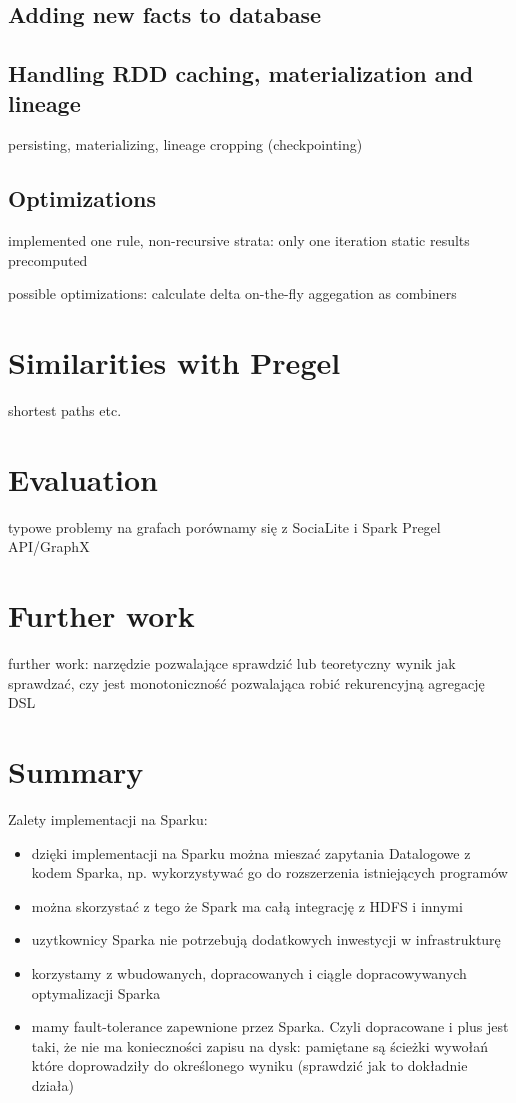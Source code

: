 \subsection{Adding new facts to database}\label{ss:impl_merge}

\subsection{Handling RDD caching, materialization and lineage}
persisting, materializing, lineage cropping (checkpointing)

\subsection{Optimizations}
implemented
	one rule, non-recursive strata: only one iteration
	static results precomputed

possible optimizations:
	calculate delta on-the-fly
	aggegation as combiners


\section{Similarities with Pregel}

shortest paths etc.



\section{Evaluation}\label{s:impl_eval}
typowe problemy na grafach
porównamy się z SociaLite i Spark Pregel API/GraphX


\section{Further work}

further work: narzędzie pozwalające sprawdzić lub teoretyczny wynik jak sprawdzać, czy jest monotoniczność pozwalająca robić rekurencyjną agregację
DSL

\section{Summary}

Zalety implementacji na Sparku:
\begin{itemize}
\item dzięki implementacji na Sparku można mieszać zapytania Datalogowe z kodem Sparka, np. wykorzystywać go do rozszerzenia istniejących programów
\item można skorzystać z tego że Spark ma całą integrację z HDFS i innymi
\item uzytkownicy Sparka nie potrzebują dodatkowych inwestycji w  infrastrukturę
\item korzystamy z wbudowanych, dopracowanych i ciągle dopracowywanych optymalizacji Sparka
\item mamy fault-tolerance zapewnione przez Sparka. Czyli dopracowane i plus jest taki, że nie ma konieczności zapisu na dysk: pamiętane są ścieżki wywołań które doprowadziły do określonego wyniku (sprawdzić jak to dokładnie działa)
\end{itemize}


